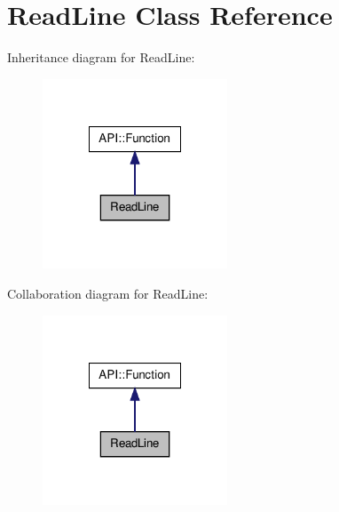 \hypertarget{class_read_line}{\section{Read\-Line Class Reference}
\label{class_read_line}
}


Inheritance diagram for Read\-Line\-:\nopagebreak
\begin{figure}[H]
\begin{center}
\leavevmode
\includegraphics[width=156pt]{class_read_line__inherit__graph}
\end{center}
\end{figure}


Collaboration diagram for Read\-Line\-:\nopagebreak
\begin{figure}[H]
\begin{center}
\leavevmode
\includegraphics[width=156pt]{class_read_line__coll__graph}
\end{center}
\end{figure}
